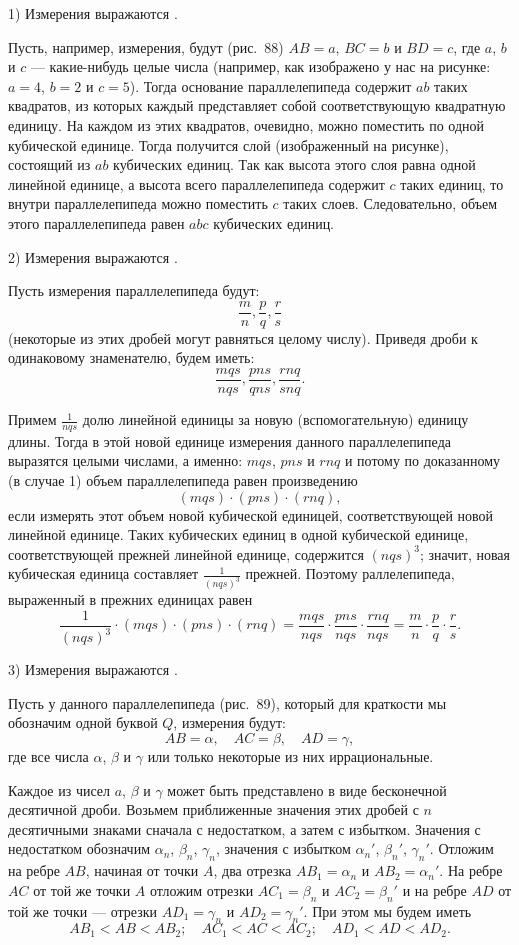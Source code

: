 \documentclass[twoside]{book}
\begin{document}
1) Измерения выражаются .

Пусть, например, измерения, будут (рис.~88) $AB=a$, $BC=b$ и $BD=c$, где $a$, $b$ и $c$ --- какие-нибудь целые числа (например, как изображено у нас на рисунке: $a=4$, $b=2$ и $c=5$).
Тогда основание параллелепипеда содержит $ab$ таких квадратов, из которых каждый представляет собой соответствующую квадратную единицу.
На каждом из этих квадратов, очевидно, можно поместить по одной кубической единице.
Тогда получится слой (изображенный на рисунке), состоящий из $ab$ кубических единиц.
Так как высота этого слоя равна одной линейной единице, а высота всего параллелепипеда содержит $c$ таких единиц, то внутри параллелепипеда можно поместить $c$ таких слоев.
Следовательно, объем этого параллелепипеда равен $abc$ кубических единиц.

2) Измерения выражаются .

Пусть измерения параллелепипеда будут:
\[\frac mn, \frac pq, \frac rs\]
(некоторые из этих дробей могут равняться целому числу).
Приведя дроби к одинаковому знаменателю, будем иметь:
\[\frac {mqs}{nqs}, \frac {pns}{qns}, \frac {rnq}{snq}.\]

Примем $\frac 1{nqs}$ долю линейной единицы за новую (вспомогательную) единицу длины.
Тогда в этой новой единице измерения данного параллелепипеда выразятся целыми числами, а именно: $mqs$, $pns$ и $rnq$
и потому по доказанному (в случае 1) объем параллелепипеда равен произведению
\[(mqs)\cdot (pns)\cdot (rnq),\]
 если измерять этот объем новой кубической единицей, соответствующей новой линейной единице.
Таких кубических единиц в одной кубической единице, соответствующей прежней линейной единице, содержится $(nqs)^3$; значит, новая кубическая единица составляет $\tfrac1{(nqs)^3}$ прежней.
Поэтому раллелепипеда, выраженный в прежних единицах равен
\[\frac1{(nqs)^3}\cdot(mqs)\cdot (pns)\cdot (rnq)=\frac{mqs}{nqs}\cdot \frac{pns}{nqs}\cdot \frac{rnq}{nqs}= \frac mn\cdot \frac pq\cdot \frac rs.\]

3) Измерения выражаются .

Пусть у данного параллелепипеда (рис.~89), который для краткости мы обозначим одной буквой $Q$, измерения будут:
\[AB=\alpha,\quad AC=\beta,\quad AD=\gamma,\]
где все числа $\alpha$, $\beta$ и $\gamma$ или только некоторые из них иррациональные.

Каждое из чисел $a$, $\beta$ и $\gamma$ может быть представлено в виде бесконечной десятичной дроби.
Возьмем приближенные значения этих дробей с $n$ десятичными знаками сначала с недостатком, а затем с избытком.
Значения с недостатком обозначим $\alpha_n$, $\beta_n$, $\gamma_n$, значения с избытком $\alpha_n'$, $\beta_n'$, $\gamma_n'$.
Отложим на ребре $AB$, начиная от точки $A$, два отрезка $AB_1 = \alpha_n$ и $AB_2=\alpha_n'$.
На ребре $AC$ от той же точки $A$ отложим отрезки $AC_1=\beta_n$ и $AC_2=\beta_n'$ и на ребре $AD$ от той же точки --- отрезки $AD_1=\gamma_n$ и $AD_2=\gamma_n'$.
При этом мы будем иметь
\[AB_1<AB<AB_2;\quad AC_1<AC<AC_2;\quad AD_1<AD<AD_2.\]
\end{document}
